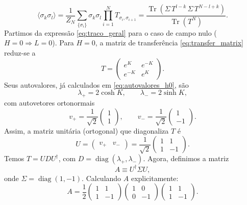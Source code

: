 \documentclass[11pt,a4paper]{article}
\begin{document}
%
\begin{equation}
\langle \sigma_k \sigma_l \rangle
= \frac{1}{Z_N} \sum_{\{\sigma_i\}} \sigma_k \sigma_l \prod_{i=1}^N T_{\sigma_i,\sigma_{i+1}}
= \frac{ \operatorname{Tr}\left( \Sigma \, T^{l-k} \, \Sigma \, T^{N-l+k} \right) }{ \operatorname{Tr}\left( T^N \right) }.
\label{eq:traco_geral}
\end{equation}
%
Partimos da expressão \eqref{eq:traco_geral} para o caso de campo nulo ($H=0 \Rightarrow L=0$). Para $H=0$, a matriz de transferência \eqref{eq:transfer_matrix} reduz-se a
%
\begin{equation}
T =
\begin{pmatrix}
e^{K} & e^{-K} \\
e^{-K} & e^{K}
\end{pmatrix}.
\end{equation}
%
Seus autovalores, já calculados em \eqref{eq:autovalores_h0}, são
%
\begin{equation}
\lambda_+ = 2\cosh K, \qquad \lambda_- = 2\sinh K,
\end{equation}
%
com autovetores ortonormais
%
\begin{equation}
v_+ = \frac{1}{\sqrt{2}}
\begin{pmatrix}
1 \\
1
\end{pmatrix}, \qquad
v_- = \frac{1}{\sqrt{2}}
\begin{pmatrix}
1 \\
-1
\end{pmatrix}.
\end{equation}
%
Assim, a matriz unitária (ortogonal) que diagonaliza $T$ é
%
\begin{equation}
U = 
\begin{pmatrix}
v_+ & v_-
\end{pmatrix}
= \frac{1}{\sqrt{2}}
\begin{pmatrix}
1 & 1 \\
1 & -1
\end{pmatrix}.
\end{equation}
%
Temos $T = U D U^\dagger$, com $D = \operatorname{diag}(\lambda_+, \lambda_-)$.
%
Agora, definimos a matriz
%
\begin{equation}
A \equiv U^\dagger \Sigma U,
\end{equation}
%
onde $\Sigma = \operatorname{diag}(1, -1)$. Calculando $A$ explicitamente:
%
\begin{equation}
A = \frac{1}{2}
\begin{pmatrix}
1 & 1 \\
1 & -1
\end{pmatrix}
\begin{pmatrix}
1 & 0 \\
0 & -1
\end{pmatrix}
\begin{pmatrix}
1 & 1 \\
1 & -1
\end{pmatrix}.
\end{equation}
\end{document}
